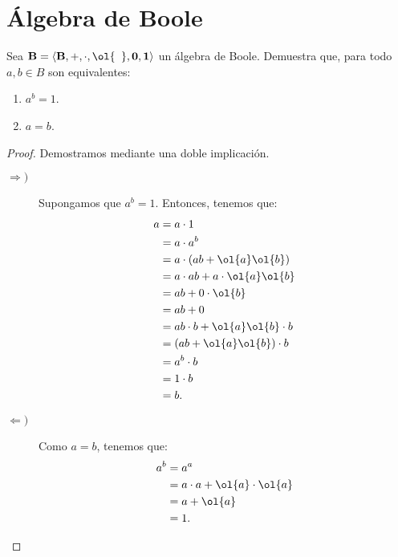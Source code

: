 \section{Álgebra de Boole}

\begin{ejercicio}
    Sea $\bf{B}=\langle B,+,\cdot,\ol{\phantom{a}}, 0,1\rangle$ un álgebra de Boole. Demuestra que, para todo $a,b\in B$ son equivalentes:
    \begin{enumerate}
        \item $a^b=1$.
        \item $a=b$.
    \end{enumerate}
    \begin{proof}
        Demostramos mediante una doble implicación.
        \begin{description}
            \item[$\Longrightarrow)$]
            
            Supongamos que $a^b=1$. Entonces, tenemos que:
            \begin{align*}
                a &= a\cdot 1\\
                &= a\cdot a^b\\
                &= a\cdot (ab + \ol{a}\ol{b})\\
                &= a\cdot ab + a\cdot \ol{a}\ol{b}\\
                &= ab + 0\cdot \ol{b}\\
                &= ab + 0\\
                &= ab\cdot b + \ol{a}\ol{b}\cdot b\\
                &= (ab + \ol{a}\ol{b})\cdot b\\
                &= a^b\cdot b\\
                &= 1\cdot b\\
                &= b.
            \end{align*}

            \item[$\Longleftarrow)$]
            
            Como $a=b$, tenemos que:
            \begin{align*}
                a^b &= a^a\\
                &= a\cdot a + \ol{a}\cdot \ol{a}\\
                &= a + \ol{a}\\
                &= 1.
            \end{align*}
        \end{description}
    \end{proof}
\end{ejercicio}



